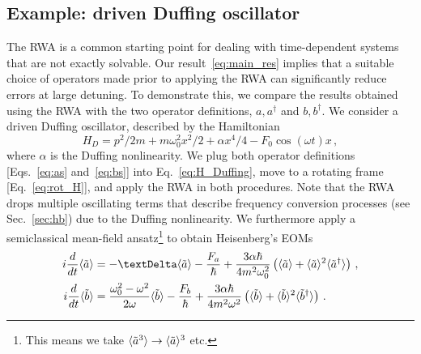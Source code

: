 \subsection{Example: driven Duffing oscillator}
The RWA is a common starting point for dealing with time-dependent systems that are not exactly solvable. Our result~\eqref{eq:main_res} implies that a suitable choice of operators made prior to applying the RWA can significantly reduce errors at large detuning. To demonstrate this, we compare the results obtained using the RWA with the two operator definitions, $a,a^\dagger$ and $b,b^\dagger$. We consider a driven Duffing oscillator, described by the Hamiltonian
\begin{equation} \label{eq:H_Duffing}
H_D = p^2/2m + m \omega_0^2 x^2/2 + \alpha x^4/4 - F_0 \cos(\omega t)  x\,,
\end{equation}
where $\alpha$ is the Duffing nonlinearity. We plug both operator definitions [Eqs.~\eqref{eq:as} and~\eqref{eq:bs}] into Eq.~\eqref{eq:H_Duffing}, move to a rotating frame [Eq.~\eqref{eq:rot_H}], and apply the RWA in both procedures. Note that the RWA drops multiple oscillating terms that describe frequency conversion processes (see Sec.~\ref{sec:hb}) due to the Duffing nonlinearity. We furthermore apply a semiclassical mean-field ansatz\footnote{This means we take $\langle \tilde{a}^3 \rangle \rightarrow \langle\tilde{a}\rangle^3$ etc.} to obtain Heisenberg's EOMs
\begin{align} \label{eq:duff_a}
% 
i \frac{d}{dt} \etil{a} &=
-\Delta \etil{a}-\frac{F_a}{\hbar}+\frac{3 \alpha \hbar}{4m^2\omega_0^2}\left(\etil{a}+\etil{a}^2\ave{\tilde{a}^\dagger}\right)\,,\\
\label{eq:duff_b}
i \frac{d}{dt} \etil{b} &= 
\frac{\omega_0^2 - \omega^2}{2\omega}\etil{b}-\frac{F_b}{\hbar}+\frac{3\alpha \hbar}{4m^2\omega^2}\left(\etil{b}+\etil{b}^2\ave{\tilde{b}^\dagger}\right)\,.
\end{align}

